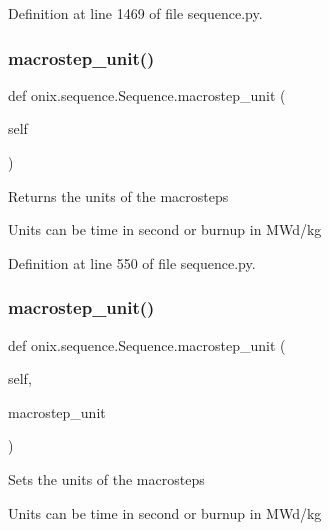 Definition at line 1469 of file sequence.\+py.

\mbox{\label{classonix_1_1sequence_1_1Sequence_ad30b07af38fcb327ddb27bfa3447a7a3}} 
\subsubsection{\texorpdfstring{macrostep\+\_\+unit()}{macrostep\_unit()}\hspace{0.1cm}{\footnotesize\ttfamily [1/2]}}
{\footnotesize\ttfamily def onix.\+sequence.\+Sequence.\+macrostep\+\_\+unit (\begin{DoxyParamCaption}\item[{}]{self }\end{DoxyParamCaption})}

\begin{DoxyVerb}Returns the units of the macrosteps

Units can be time in second or burnup in MWd/kg
\end{DoxyVerb}
 

Definition at line 550 of file sequence.\+py.

\mbox{\label{classonix_1_1sequence_1_1Sequence_adaa3417c90ead3932aa9da69962dd3ac}} 
\subsubsection{\texorpdfstring{macrostep\+\_\+unit()}{macrostep\_unit()}\hspace{0.1cm}{\footnotesize\ttfamily [2/2]}}
{\footnotesize\ttfamily def onix.\+sequence.\+Sequence.\+macrostep\+\_\+unit (\begin{DoxyParamCaption}\item[{}]{self,  }\item[{}]{macrostep\+\_\+unit }\end{DoxyParamCaption})}

\begin{DoxyVerb}Sets the units of the macrosteps

Units can be time in second or burnup in MWd/kg\end{DoxyVerb}
 

